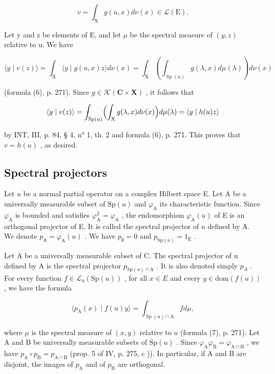 \[
v = \int_ {\mathrm{X}} g (u, x) d \nu (x) \in \mathscr {L} (\mathrm{E}).
\]

Let y and z be elements of E, and let \(\mu\) be the spectral measure of \((y, z)\) relative to u. We have

\[
\langle y \mid v (z) \rangle = \int_ {\mathrm{X}} \langle y \mid g (u, x) z \rangle d \nu (x) = \int_ {\mathrm{X}} \left(\int_ {\operatorname{Sp} (u)} g (\lambda , x) d \mu (\lambda)\right) d \nu (x)
\]

(formula (6), p. 271). Since \(g \in \mathcal{K}(\mathbf{C} \times \mathbf{X})\) , it follows that

\[
\langle y \mid v (z) \rangle = \int_ {\operatorname{Sp} (u)} \Bigl (\int_ {\mathrm{X}} g (\lambda , x) d \nu (x) \Bigr) d \mu (\lambda) = \langle y \mid h (u) z \rangle
\]

by INT, III, p. 84, § 4, n° 1, th. 2 and formula (6), p. 271. This proves that \(v = h(u)\) , as desired.

\subsection{Spectral projectors}

Let \(u\) be a normal partial operator on a complex Hilbert space E. Let A be a universally measurable subset of \(\mathrm{Sp}(u)\) and \(\varphi_{\mathrm{A}}\) its characteristic function. Since \(\varphi_{\mathrm{A}}\) is bounded and satisfies \(\varphi_{\mathrm{A}}^{2} = \varphi_{\mathrm{A}}\) , the endomorphism \(\varphi_{\mathrm{A}}(u)\) of E is an orthogonal projector of E. It is called the spectral projector of \(u\) defined by A. We denote \(p_{\mathrm{A}} = \varphi_{\mathrm{A}}(u)\) . We have \(p_{\emptyset} = 0\) and \(p_{\mathrm{Sp}(u)} = 1_{\mathrm{E}}\) .

Let A be a universally measurable subset of C. The spectral projector of u defined by A is the spectral projector \(p_{\mathrm{Sp}(u)\cap\mathrm{A}}\) . It is also denoted simply \(p_{A}\) . For every function \(f \in \mathcal{L}_{\mathrm{u}}(\mathrm{Sp}(u))\) , for all \(x \in E\) and every \(y \in \mathrm{dom}(f(u))\) , we have the formula

\[
\langle p _ {\mathrm{A}} (x) \mid f (u) y \rangle = \int_ {\operatorname{Sp} (u) \cap \mathrm{A}} f d \mu ,\tag{10}
\]

where \(\mu\) is the spectral measure of \((x,y)\) relative to \(u\) (formula (7), p. 271). Let A and B be universally measurable subsets of \(\mathrm{Sp}(u)\) . Since \(\varphi_{\mathrm{A}}\varphi_{\mathrm{B}} = \varphi_{\mathrm{A}\cap \mathrm{B}}\) , we have \(p_{\mathrm{A}} \circ p_{\mathrm{B}} = p_{\mathrm{A}\cap \mathrm{B}}\) (prop. 5 of IV, p. 275, \(c\) )). In particular, if A and B are disjoint, the images of \(p_{\mathrm{A}}\) and of \(p_{\mathrm{B}}\) are orthogonal.


